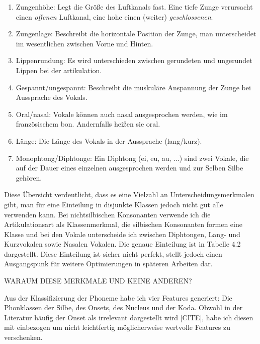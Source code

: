 \begin{enumerate}

\item Zungenhöhe: Legt die Größe des Luftkanals fast. Eine tiefe Zunge verursacht einen \textit{offenen} Luftkanal, eine hohe einen (weiter) \textit{geschlossenen}. \cite[S.~23]{Hall2011}

\item Zungenlage: Beschreibt die horizontale Position der Zunge, man unterscheidet im wesentlichen zwischen Vorne und Hinten.\cite[S.~23f]{Hall2011}

\item Lippenrundung: Es wird unterschieden zwischen gerundeten und ungerundet Lippen bei der artikulation.\cite[S.~24]{Hall2011}

\item Gespannt/ungespannt: Beschreibt die muskuläre Anspannung der Zunge bei Aussprache des Vokals.\cite[S.~27]{Hall2011}

\item Oral/nasal: Vokale können auch nasal ausgesprochen werden, wie im französischem bon. Andernfalls heißen sie oral.\cite[S.~28]{Hall2011}

\item Länge: Die Länge des Vokals in der Aussprache (lang/kurz). \cite[S.~28]{Hall2011}

\item Monophtong/Diphtonge: Ein Diphtong (ei, eu, au, ...) sind zwei Vokale, die auf der Dauer eines einzelnen ausgesprochen werden und zur Selben Silbe gehören.\cite[S.~29]{Hall2011}

\end{enumerate}

Diese Übersicht verdeutlicht, dass es eine Vielzahl an Unterscheidungsmerkmalen gibt, man für eine Einteilung in disjunkte Klassen jedoch nicht gut alle verwenden kann. Bei nichtsilbischen Konsonanten verwende ich die Artikulationsart als Klassenmerkmal, die silbischen Konsonanten formen eine Klasse und bei den Vokale unterscheide ich zwischen Diphtongen, Lang- und Kurzvokalen sowie Nasalen Vokalen. Die genaue Einteilung ist in Tabelle 4.2 dargestellt. Diese Einteilung ist sicher nicht perfekt, stellt jedoch einen Ausgangspunk für weitere Optimierungen in späteren Arbeiten dar.

WARAUM DIESE MERKMALE UND KEINE ANDEREN?

Aus der Klassifizierung der Phoneme habe ich vier Features generiert: Die Phonklassen der Silbe, des Onsets, des Nucleus und der Koda. Obwohl in der Literatur häufig der Onset als irrelevant dargestellt wird [CITE], habe ich diesen mit einbezogen um nicht leichtfertig möglicherweise wertvolle Features zu verschenken.

